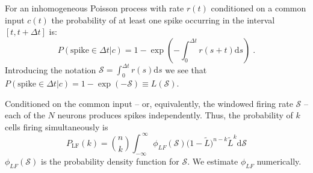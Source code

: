 \documentclass[%
 reprint,
 twocolumn,
 amsmath,amssymb,
 aps,
floatfix,
]{revtex4}
\newcommand{\dd}{\mathrm{d}}
\begin{document}
%
%
%
%

For an inhomogeneous Poisson process with rate $r(t)$ conditioned on a common input $c(t)$ the probability of at least one spike occurring in the interval $[t,t+\Delta t]$ is:
\begin{equation*}
P(\text{spike}\in\Delta t | c ) = 1 - \exp{\left(-\int_0^{\Delta t} \! r(s+t) \dd s \right)} \;.
\end{equation*}
Introducing the notation  $\mathcal{S} = \int_0^{\Delta t} \! r(s) \dd s $ we see that $P(\text{spike}\in\Delta t | c ) = 1 - \exp (-\mathcal{S}) \equiv L(\mathcal{S})$.  

Conditioned on the common input -- or, equivalently, the windowed firing rate $\mathcal{S}$ -- each of the $N$ neurons produces spikes independently.  Thus, the probability of $k$ cells firing simultaneously is
\begin{equation}
P_{\text{LF}}(k) = \binom{n}{k} \int_{-\infty}^{~\infty} \phi_{LF}(\mathcal{S}) \big(1-\tilde{L}\big)^{n-k} \tilde{L}^{k} \dd \mathcal{S}
\end{equation}
$\phi_{LF}(\mathcal{S})$ is the probability density function for $\mathcal{S}$.  We estimate $\phi_{LF}$ numerically.
\end{document}
